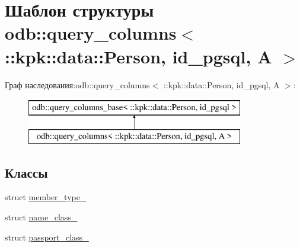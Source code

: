 \hypertarget{structodb_1_1query__columns_3_01_1_1kpk_1_1data_1_1_person_00_01id__pgsql_00_01_a_01_4}{}\section{Шаблон структуры odb\+:\+:query\+\_\+columns$<$ \+:\+:kpk\+:\+:data\+:\+:Person, id\+\_\+pgsql, A $>$}
\label{structodb_1_1query__columns_3_01_1_1kpk_1_1data_1_1_person_00_01id__pgsql_00_01_a_01_4}
Граф наследования\+:odb\+:\+:query\+\_\+columns$<$ \+:\+:kpk\+:\+:data\+:\+:Person, id\+\_\+pgsql, A $>$\+:\begin{figure}[H]
\begin{center}
\leavevmode
\includegraphics[height=2.000000cm]{structodb_1_1query__columns_3_01_1_1kpk_1_1data_1_1_person_00_01id__pgsql_00_01_a_01_4}
\end{center}
\end{figure}
\subsection*{Классы}
\begin{DoxyCompactItemize}
\item 
struct \hyperlink{structodb_1_1query__columns_3_01_1_1kpk_1_1data_1_1_person_00_01id__pgsql_00_01_a_01_4_1_1member__type__}{member\+\_\+type\+\_\+}
\item 
struct \hyperlink{structodb_1_1query__columns_3_01_1_1kpk_1_1data_1_1_person_00_01id__pgsql_00_01_a_01_4_1_1name__class__}{name\+\_\+class\+\_\+}
\item 
struct \hyperlink{structodb_1_1query__columns_3_01_1_1kpk_1_1data_1_1_person_00_01id__pgsql_00_01_a_01_4_1_1passport__class__}{passport\+\_\+class\+\_\+}
\end{DoxyCompactItemize}
